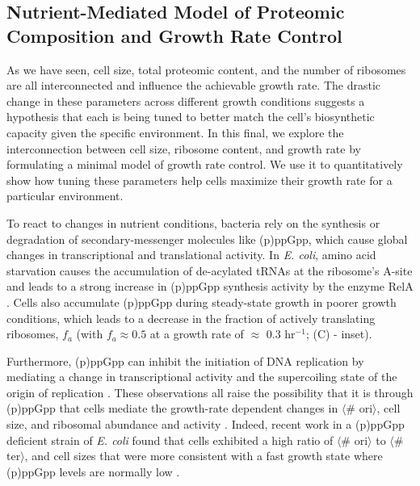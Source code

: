 
\subsection{Nutrient-Mediated Model of Proteomic Composition and Growth Rate Control}

As we have seen, cell size, total proteomic content, and the number of ribosomes
are all interconnected and influence the achievable growth rate. The drastic
change in these parameters across different growth conditions suggests a hypothesis
that each is being tuned to better match the cell's biosynthetic capacity given the
specific environment.
In this final, we explore the interconnection
between cell size, ribosome content, and growth rate by formulating a minimal
model of growth rate control. We use it to quantitatively show how tuning these
parameters help cells maximize their growth rate for a particular environment.

To react to changes in nutrient conditions, bacteria rely on the synthesis or
degradation of secondary-messenger molecules  like (p)ppGpp, which cause global
changes in transcriptional and translational activity. In \textit{E. coli},
amino acid starvation causes the accumulation of de-acylated tRNAs at the
ribosome's A-site and leads to a strong increase in (p)ppGpp synthesis activity
by the enzyme RelA \citep{hauryliuk2015}. Cells also accumulate (p)ppGpp  during
steady-state growth in poorer growth conditions, which leads to a decrease in
the fraction of actively translating ribosomes, $f_a$  (with $f_a \approx 0.5$
at a growth rate of $\approx$ 0.3 hr$^{-1}$; (C) - inset).

Furthermore, (p)ppGpp can inhibit the initiation of DNA replication by mediating
a change in transcriptional activity and the supercoiling state of the origin of
replication \citep{kraemer2019}. These observations all raise the possibility
that it is through (p)ppGpp that cells mediate the growth-rate dependent changes
in $\langle$\# ori$\rangle$, cell size, and ribosomal abundance and activity
\citep{zhu2019, Buke2020}. Indeed, recent work in a (p)ppGpp deficient strain of
\textit{E. coli} found that cells exhibited a high ratio of $\langle$\#
ori$\rangle$ to $\langle$\# ter$\rangle$, and cell sizes that were more
consistent with a fast growth state where (p)ppGpp levels are normally low
\citep{fernandezcoll2020}.


